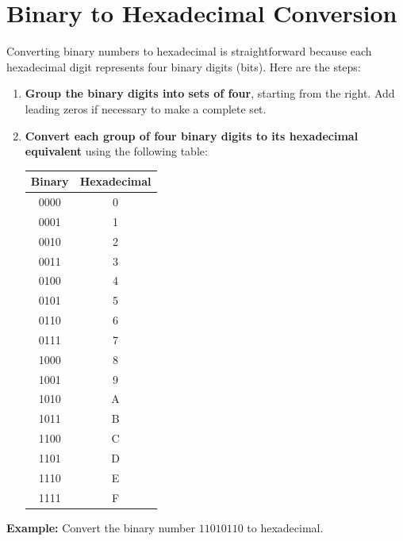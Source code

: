\documentclass{report}
\begin{document}
\pagebreak


\section{Binary to Hexadecimal Conversion}

Converting binary numbers to hexadecimal is straightforward because each hexadecimal digit represents four binary digits (bits). Here are the steps:

\begin{enumerate}
	\item \textbf{Group the binary digits into sets of four}, starting from the right. Add leading zeros if necessary to make a complete set.
	\item \textbf{Convert each group of four binary digits to its hexadecimal equivalent} using the following table:

	      \begin{center}
		      \begin{tabular}{|c|c|}
			      \hline
			      Binary & Hexadecimal \\
			      \hline
			      0000   & 0           \\
			      0001   & 1           \\
			      0010   & 2           \\
			      0011   & 3           \\
			      0100   & 4           \\
			      0101   & 5           \\
			      0110   & 6           \\
			      0111   & 7           \\
			      1000   & 8           \\
			      1001   & 9           \\
			      1010   & A           \\
			      1011   & B           \\
			      1100   & C           \\
			      1101   & D           \\
			      1110   & E           \\
			      1111   & F           \\
			      \hline
		      \end{tabular}
	      \end{center}
\end{enumerate}

\textbf{Example:} Convert the binary number \(11010110\) to hexadecimal.
\end{document}
